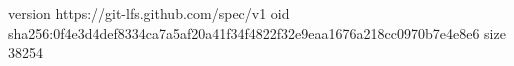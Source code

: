 version https://git-lfs.github.com/spec/v1
oid sha256:0f4e3d4def8334ca7a5af20a41f34f4822f32e9eaa1676a218cc0970b7e4e8e6
size 38254
